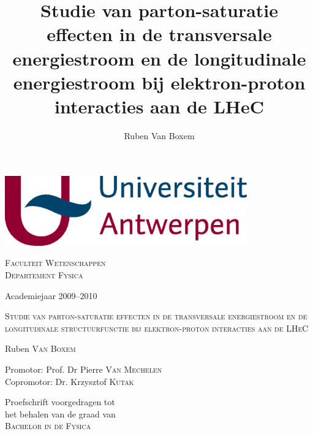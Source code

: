 \documentclass[a4paper,11pt]{article}
\title{Studie van parton-saturatie effecten in de transversale energiestroom en de longitudinale energiestroom bij elektron-proton interacties aan de LHeC}
\author{Ruben Van Boxem}
\numberwithin{equation}{section} %
\begin{document}
\fontsize{12pt}{14pt}\selectfont

\begin{center}

\includegraphics[height=3cm]{Afbeeldingen/UA.eps}

\vspace{1cm}

\fontsize{14pt}{17pt}\selectfont
\textsc{Faculteit Wetenschappen} \\
\textsc{Departement Fysica}
\fontsize{12pt}{14pt}\selectfont
\vspace{0.3cm}

\vspace{1.2cm}

Academiejaar 2009--2010

\vspace{2.8cm}

\fontsize{17.28pt}{21pt}\selectfont

\textsc{Studie van parton-saturatie effecten in de transversale energiestroom en de longitudinale structuurfunctie bij elektron-proton interacties aan de LHeC}

\fontsize{12pt}{14pt}\selectfont

\vspace{3cm}

Ruben \textsc{Van Boxem}	

\vspace{2cm}

Promotor: Prof. Dr Pierre \textsc{Van Mechelen}\\
Copromotor: Dr. Krzysztof \textsc{Kutak} \\
\vspace{2cm}
\end{center}
Proefschrift voorgedragen tot \\
het behalen van de graad van\\
\textsc{Bachelor in de Fysica}

\thispagestyle{empty}
\newpage
\end{document}
